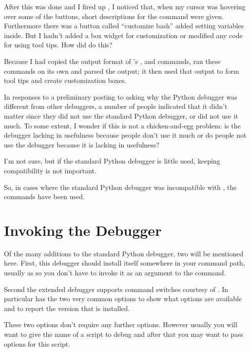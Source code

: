 After this was done and I fired up , I noticed that, when my
cursor was hovering over some of the buttons, short descriptions for
the command were given. Furthermore there was a button called
``customize bash'' added setting variables inside. But I hadn't added
a box widget for customization or modified any code for using tool
tips. How did  do this?

Because I had copied the output format of 's ,
 and  commands,  ran these commands on
its own and parsed the output; it then used that output to form tool
tips and create customization boxes.

In responses to a preliminary posting to 
asking why the Python debugger was different from other debuggers, a
number of people indicated that it didn't matter since they did not use
the standard Python debugger, or did not use it much.  To some extent,
I wonder if this is not a chicken-and-egg problem: is the debugger
lacking in usefulness because people don't use it much or do people
not use the debugger because it is lacking in usefulness?

I'm not sure, but if the standard Python debugger is little used,
keeping compatibility is not important.

So, in cases where the standard Python
debugger was incompatible with , the  commands
have been used.

\section{Invoking the Debugger \label{pydb-invocation}}

Of the many additions to the standard Python debugger, two will be
mentioned here. First, this debugger should install itself somewhere
in your command path, usually as  so you don't have to
invoke it as an argument to the  command.

Second the extended debugger supports command switches courtesy of
.
In particular  has the two very common options
 to show what options are available and 
to report the version that is installed. 

These two options don't require any
further options. However usually you will want to give the name of a
script to debug and after that you may want to pass options for this
script.

